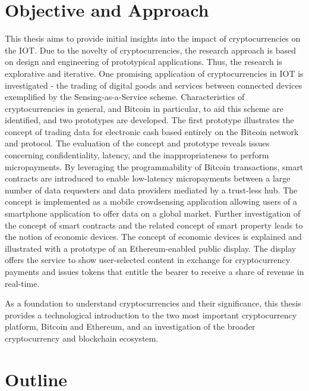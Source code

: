 \section{Objective and Approach}

This thesis aims to provide initial insights into the impact of cryptocurrencies on the \ac{IOT}. Due to the novelty of cryptocurrencies, the research approach is based on design and engineering of prototypical applications. Thus, the research is explorative and iterative. One promising application of cryptocurrencies in \ac{IOT} is investigated - the trading of digital goods and services between connected devices exemplified by the Sensing-as-a-Service scheme. Characteristics of cryptocurrencies in general, and Bitcoin in particular, to aid this scheme are identified, and two prototypes are developed. The first prototype illustrates the concept of trading data for electronic cash based entirely on the Bitcoin network and protocol. The evaluation of the concept and prototype reveals issues concerning confidentiality, latency, and the inappropriateness to perform micropayments. By leveraging the programmability of Bitcoin transactions, smart contracts are introduced to enable low-latency micropayments between a large number of data requesters and data providers mediated by a trust-less hub. The concept is implemented as a mobile crowdsensing application allowing users of a smartphone application to offer data on a global market. 
Further investigation of the concept of smart contracts and the related concept of smart property leads to the notion of economic devices. The concept of economic devices is explained and illustrated with a prototype of an Ethereum-enabled public display. The display offers the service to show user-selected content in exchange for cryptocurrency payments and issues tokens that entitle the bearer to receive a share of revenue in real-time. 

As a foundation to understand cryptocurrencies and their significance, this thesis provides a technological introduction to the two most important cryptocurrency platform, Bitcoin and Ethereum, and an investigation of the broader cryptocurrency and blockchain ecosystem.


\section{Outline}

